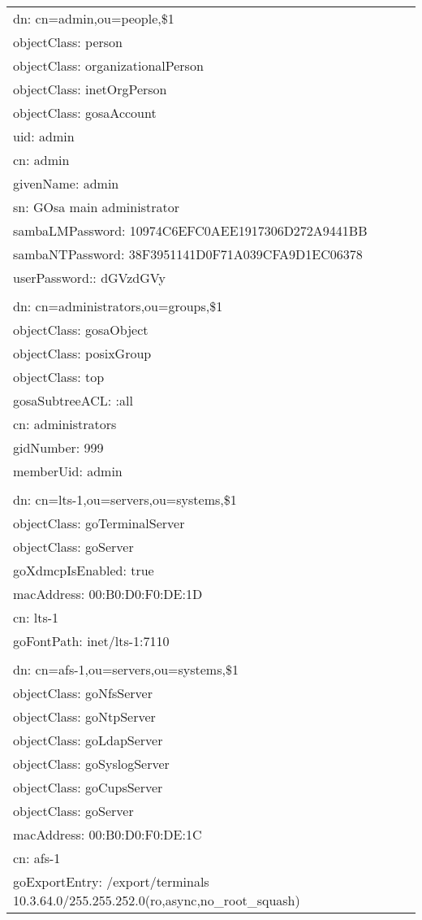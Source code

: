 \begin{center}
\begin{longtable}{|l|}
\\
dn: cn=admin,ou=people,\$1\\
objectClass: person\\
objectClass: organizationalPerson\\
objectClass: inetOrgPerson\\
objectClass: gosaAccount\\
uid: admin\\
cn: admin\\
givenName: admin\\
sn: GOsa main administrator\\
sambaLMPassword: 10974C6EFC0AEE1917306D272A9441BB\\
sambaNTPassword: 38F3951141D0F71A039CFA9D1EC06378\\
userPassword:: dGVzdGVy\\
\\
dn: cn=administrators,ou=groups,\$1\\
objectClass: gosaObject\\
objectClass: posixGroup\\
objectClass: top\\
gosaSubtreeACL: :all\\
cn: administrators\\
gidNumber: 999\\
memberUid: admin\\
\\
dn: cn=lts-1,ou=servers,ou=systems,\$1\\
objectClass: goTerminalServer\\
objectClass: goServer\\
goXdmcpIsEnabled: true\\
macAddress: 00:B0:D0:F0:DE:1D\\
cn: lts-1\\
goFontPath: inet/lts-1:7110\\
\\
dn: cn=afs-1,ou=servers,ou=systems,\$1\\
objectClass: goNfsServer\\
objectClass: goNtpServer\\
objectClass: goLdapServer\\
objectClass: goSyslogServer\\
objectClass: goCupsServer\\
objectClass: goServer\\
macAddress: 00:B0:D0:F0:DE:1C\\
cn: afs-1\\
goExportEntry: /export/terminals 10.3.64.0/255.255.252.0(ro,async,no\_root\_squash)\\

\end{longtable}
\end{center}
